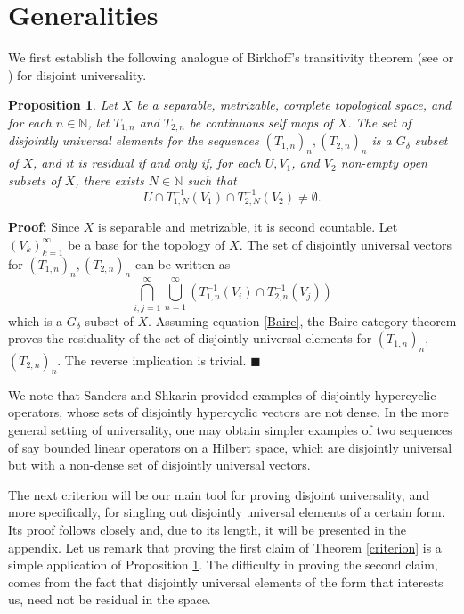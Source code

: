 \documentclass[12pt,a4paper]{amsart}
\theoremstyle{plain}
\newtheorem{proposition}[theorem]{Proposition}
\theoremstyle{definition}
\theoremstyle{remark}
\theoremstyle{fact}
\newenvironment{pf}
{\noindent\textbf{Proof:}}
{\hfill $\blacksquare$\par\medskip}
\begin{document}
\section{Generalities}

We first establish the following analogue of Birkhoff's transitivity theorem (see \cite[Theorem 2.19]{gp} or \cite[Theorem 1.2]{bm}) for disjoint universality. 

\begin{proposition} \label{Birkhoff}
Let $X$ be a separable, metrizable, complete topological space, 
and for each $n\in \mathbb{N}$, let $T_{1,n}$ and $T_{2,n}$ be continuous self maps of $X$. The set of disjointly universal elements for the sequences $(T_{1,n})_n, (T_{2,n})_n$  is a $G_{\delta}$ subset of $X$, and it is residual if and only if, for each $U, V_1$, and $V_2$ non-empty open subsets of $X$, there exists $N\in \mathbb{N}$ such that
\begin{equation}\label{Baire}
U \cap T^{-1}_{1,N} (V_1) \cap T^{-1}_{2,N} (V_2) \neq \emptyset.
\end{equation}
\end{proposition}

\begin{pf}
    Since $X$ is separable and metrizable, it is second countable. Let $(V_k)_{k=1}^{\infty}$ be a base for the topology of $X$. The set of disjointly universal vectors for $(T_{1,n})_n, (T_{2,n})_n$  can be written as
    $$
    \bigcap_{i,j=1}^{\infty}\bigcup_{n=1}^{\infty}( T^{-1}_{1,n} (V_i) \cap T^{-1}_{2,n} (V_j))
    $$
    which is a $G_{\delta}$ subset of $X$. Assuming equation \ref{Baire}, the Baire category theorem proves the residuality of the set of disjointly universal elements for $(T_{1,n})_n$, $(T_{2,n})_n$. The reverse implication is trivial.
    \end{pf}

    We note that Sanders and Shkarin \cite{SaSh} provided examples of disjointly hypercyclic operators, whose sets of disjointly hypercyclic vectors are not dense. In the more general setting of universality, one may obtain simpler examples of two sequences of say bounded linear operators on a Hilbert space, which are disjointly universal but with a non-dense set of disjointly universal vectors.  

    The next criterion will be our main tool for proving disjoint universality, and more specifically, for singling out disjointly universal elements of a certain form. Its proof follows closely \cite[Theorem 2.1]{Dave} and, due to its length, it will be presented in the appendix. Let us remark that proving the first claim of Theorem \ref{criterion} is a simple application of Proposition \ref{Birkhoff}. The difficulty in proving the second claim, comes from the fact that disjointly universal elements of the form that interests us, need not be residual in the space. 
\end{document}

